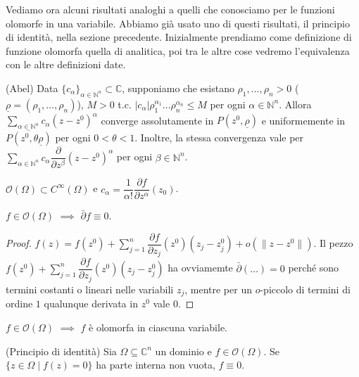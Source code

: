 Vediamo ora alcuni risultati analoghi a quelli che conosciamo per le funzioni olomorfe in una variabile. Abbiamo già usato uno di questi risultati, il principio di identità, nella sezione precedente. Inizialmente prendiamo come definizione di funzione olomorfa quella di analitica, poi tra le altre cose vedremo l'equivalenza con le altre definizioni date.

\begin{lm}
  (Abel) Data $\{c_{\alpha}\}_{\alpha \in \mathbb{N}^n} \subset \mathbb{C}$, supponiamo che esistano $\rho_1, \dots, \rho_n>0$ ($\underline{\rho}=(\rho_1, \dots, \rho_n)$), $M>0$ t.c. $|c_{\alpha}|\rho_1^{\alpha_1}\dots\rho_n^{\alpha_n} \le M$ per ogni $\alpha \in \mathbb{N}^n$.
  Allora $\displaystyle \sum_{\alpha \in \mathbb{N}^n} c_{\alpha}(z-z^0)^{\alpha}$ converge assolutamente in $P(z^0, \underline{\rho})$ e uniformemente in $\overline{P(z^0, \theta\underline{\rho})}$ per ogni $0<\theta<1$.
  Inoltre, la stessa convergenza vale per $\displaystyle \sum_{\alpha \in \mathbb{N}^n} c_{\alpha} \dfrac{\partial}{\partial z^\beta}(z-z^0)^\alpha$ per ogni $\beta \in \mathbb{N}^n$.
\end{lm}

\begin{cor} \label{coeff_anal_multi}
  $\mathcal{O}(\Omega) \subset C^\infty(\Omega)$ e $c_\alpha=\dfrac{1}{\alpha!}\dfrac{\partial f}{\partial z^\alpha}(z_0)$.
\end{cor}

\begin{cor}
  $f \in \mathcal{O}(\Omega)$ $\implies$ $\bar{\partial}f \equiv 0$.
\end{cor}

\begin{proof}
  $\displaystyle f(z)=f(z^0)+\sum_{j=1}^n \dfrac{\partial f}{\partial z_j}(z^0)(z_j-z_j^0)+o(\|z-z^0\|)$. Il pezzo $\displaystyle f(z^0)+\sum_{j=1}^n \dfrac{\partial f}{\partial z_j}(z^0)(z_j-z_j^0)$ ha ovviamemte $\bar{\partial}(\dots)=0$ perché sono termini costanti o lineari nelle variabili $z_j$, mentre per un $o$-piccolo di termini di ordine $1$ qualunque derivata in $z^0$ vale $0$.
\end{proof}

\begin{cor}
  $f \in \mathcal{O}(\Omega)$ $\implies$ $f$ è olomorfa in ciascuna variabile.
\end{cor}

\begin{prop}
  (Principio di identità) Sia $\Omega \subseteq \mathbb{C}^n$ un dominio e $f \in \mathcal{O}(\Omega)$. Se $\{z \in \Omega \mid f(z)=0\}$ ha parte interna non vuota, $f \equiv 0$.
\end{prop}

